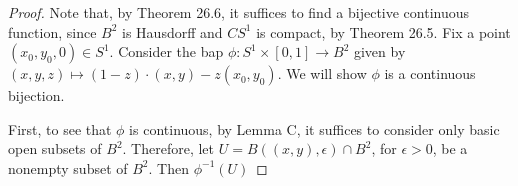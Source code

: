 \begin{proof}
Note that, by Theorem 26.6, it suffices to find a bijective
continuous function, since $B^2$ is Hausdorff and $CS^1$ is
compact, by Theorem 26.5. Fix a point $(x_0,y_0,0)\in
S^1$. Consider the bap $\phi\colon S^1\times[0,1]\to B^2$ given by
$(x,y,z)\mapsto (1-z)\cdot(x,y)-z(x_0,y_0)$. We will show $\phi$
is a continuous bijection.

First, to see that $\phi$ is continuous, by Lemma C, it suffices
to consider only basic open subsets of $B^2$. Therefore, let
$U=B((x,y),\epsilon)\cap B^2$, for $\epsilon>0$, be a nonempty
subset of $B^2$. Then $\phi^{-1}(U)$
\end{proof}

